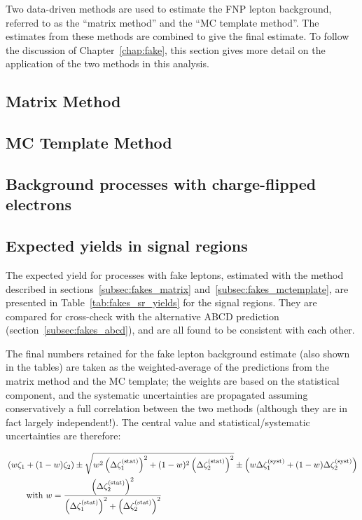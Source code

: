 Two data-driven methods are used to estimate the FNP lepton background, referred to as the ``matrix method'' and the ``MC template method''.
The estimates from these methods are combined to give the final estimate. 
To follow the discussion of Chapter~\ref{chap:fake}, 
this section gives more detail on the application of the two methods in this analysis.

\subsection{Matrix Method}


\subsection{MC Template Method}



\subsection{Background processes with charge-flipped electrons}


\subsection{Expected yields in signal regions}
\label{subsec:fakes_yields}

The expected yield for processes with fake leptons, 
estimated with the method described in sections~\ref{subsec:fakes_matrix} and~\ref{subsec:fakes_mctemplate}, 
are presented in Table~\ref{tab:fakes_sr_yields} for the signal regions. 
They are compared for cross-check with the alternative ABCD prediction (section~\ref{subsec:fakes_abcd}), 
and are all found to be consistent with each other. 

The final numbers retained for the fake lepton background estimate (also shown in the tables) 
are taken as the weighted-average of the predictions from the matrix method and the MC template; 
the weights are based on the statistical component, and the systematic uncertainties are propagated 
assuming conservatively a full correlation between the two methods (although they are in fact largely independent!). 
The central value and statistical/systematic uncertainties are therefore: 

\begin{align}
&\left(w\zeta_1 + (1-w)\zeta_2\right) 
\pm \sqrt{w^2\left(\Delta\zeta_1^\text{(stat)}\right)^2 + (1-w)^2\left(\Delta\zeta_2^\text{(stat)}\right)^2} 
\pm \left(w\Delta\zeta_1^\text{(syst)} + (1-w)\Delta\zeta_2^\text{(syst)}\right)\\
&\qquad\text{ with }w=\frac{\left(\Delta\zeta_2^\text{(stat)}\right)^2}{\left(\Delta\zeta_1^\text{(stat)}\right)^2+\left(\Delta\zeta_2^\text{(stat)}\right)^2}\notag
\end{align}

